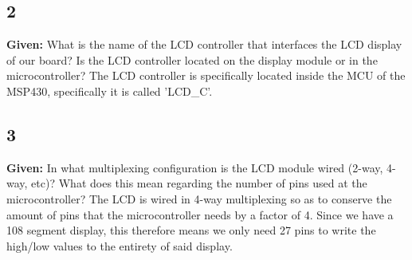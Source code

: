 \documentclass{article}
\begin{document}
\subsection{2}
\textbf{Given:} What is the name of the LCD controller that interfaces the LCD display of our board? Is the LCD controller located on the display module or in the microcontroller?
\newline
\newline
The LCD controller is specifically located inside the MCU of the MSP430, specifically it is called 'LCD\_C'.

\subsection{3}
\textbf{Given:} In what multiplexing configuration is the LCD module wired (2-way, 4-way, etc)? What does this mean regarding the number of pins used at the microcontroller?
\newline
\newline
The LCD is wired in 4-way multiplexing so as to conserve the amount of pins that the microcontroller needs by a factor of 4. Since we have a 108 segment display, this therefore means we only need 27 pins to write the high/low values to the entirety of said display.
\end{document}
